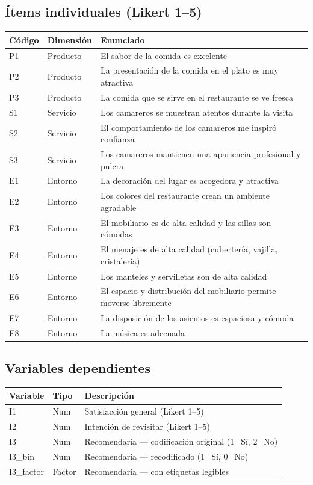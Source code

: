 \documentclass[
  spanish,
]{article}
\begin{document}
\subsection{Ítems individuales (Likert
1--5)}\label{uxedtems-individuales-likert-15}

\begin{tabu} to 
\toprule
Código & Dimensión & Enunciado\\
\midrule
P1 & Producto & El sabor de la comida es excelente\\
P2 & Producto & La presentación de la comida en el plato es muy atractiva\\
P3 & Producto & La comida que se sirve en el restaurante se ve fresca\\
S1 & Servicio & Los camareros se muestran atentos durante la visita\\
S2 & Servicio & El comportamiento de los camareros me inspiró confianza\\
\addlinespace
S3 & Servicio & Los camareros mantienen una apariencia profesional y pulcra\\
E1 & Entorno & La decoración del lugar es acogedora y atractiva\\
E2 & Entorno & Los colores del restaurante crean un ambiente agradable\\
E3 & Entorno & El mobiliario es de alta calidad y las sillas son cómodas\\
E4 & Entorno & El menaje es de alta calidad (cubertería, vajilla, cristalería)\\
\addlinespace
E5 & Entorno & Los manteles y servilletas son de alta calidad\\
E6 & Entorno & El espacio y distribución del mobiliario permite moverse libremente\\
E7 & Entorno & La disposición de los asientos es espaciosa y cómoda\\
E8 & Entorno & La música es adecuada\\
\bottomrule
\end{tabu}

\subsection{Variables dependientes}\label{variables-dependientes}

\begin{table}[!h]
\centering
\begin{tabular}{ll>{\raggedright\arraybackslash}p{9cm}}
\toprule
Variable & Tipo & Descripción\\
\midrule
I1 & Num & Satisfacción general (Likert 1--5)\\
I2 & Num & Intención de revisitar (Likert 1--5)\\
I3 & Num & Recomendaría --- codificación original (1=Sí, 2=No)\\
I3\_bin & Num & Recomendaría --- recodificado (1=Sí, 0=No)\\
I3\_factor & Factor & Recomendaría --- con etiquetas legibles\\
\bottomrule
\end{tabular}
\end{table}
\end{document}
